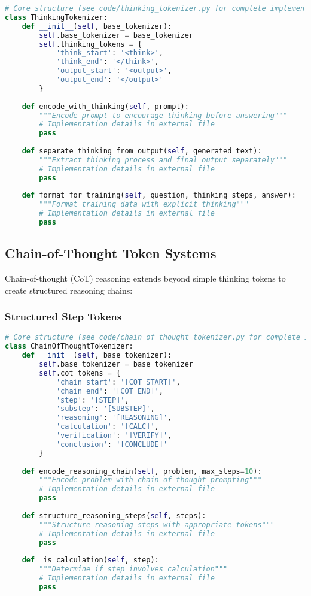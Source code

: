 \begin{lstlisting}[language=Python, caption=Basic thinking token implementation]
# Core structure (see code/thinking_tokenizer.py for complete implementation)
class ThinkingTokenizer:
    def __init__(self, base_tokenizer):
        self.base_tokenizer = base_tokenizer
        self.thinking_tokens = {
            'think_start': '<think>',
            'think_end': '</think>',
            'output_start': '<output>',
            'output_end': '</output>'
        }
        
    def encode_with_thinking(self, prompt):
        """Encode prompt to encourage thinking before answering"""
        # Implementation details in external file
        pass
    
    def separate_thinking_from_output(self, generated_text):
        """Extract thinking process and final output separately"""
        # Implementation details in external file
        pass
    
    def format_for_training(self, question, thinking_steps, answer):
        """Format training data with explicit thinking"""
        # Implementation details in external file
        pass
\end{lstlisting}

\subsection{Chain-of-Thought Token Systems}

Chain-of-thought (CoT) reasoning extends beyond simple thinking tokens to create structured reasoning chains:

\subsubsection{Structured Step Tokens}

\begin{lstlisting}[language=Python, caption=Chain-of-thought step tokenization]
# Core structure (see code/chain_of_thought_tokenizer.py for complete implementation)
class ChainOfThoughtTokenizer:
    def __init__(self, base_tokenizer):
        self.base_tokenizer = base_tokenizer
        self.cot_tokens = {
            'chain_start': '[COT_START]',
            'chain_end': '[COT_END]',
            'step': '[STEP]',
            'substep': '[SUBSTEP]',
            'reasoning': '[REASONING]',
            'calculation': '[CALC]',
            'verification': '[VERIFY]',
            'conclusion': '[CONCLUDE]'
        }
        
    def encode_reasoning_chain(self, problem, max_steps=10):
        """Encode problem with chain-of-thought prompting"""
        # Implementation details in external file
        pass
    
    def structure_reasoning_steps(self, steps):
        """Structure reasoning steps with appropriate tokens"""
        # Implementation details in external file
        pass
    
    def _is_calculation(self, step):
        """Determine if step involves calculation"""
        # Implementation details in external file
        pass
\end{lstlisting}

